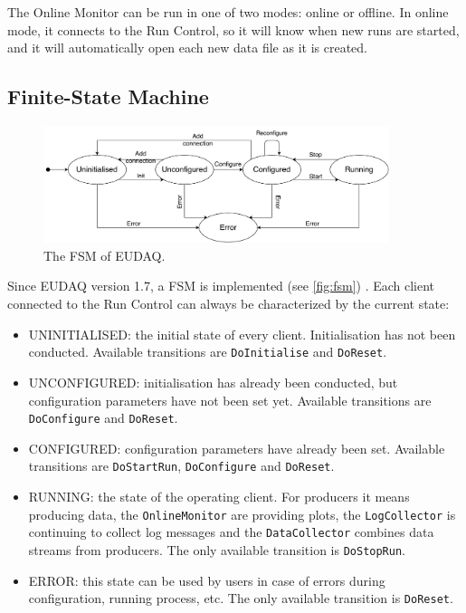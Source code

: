 The Online Monitor can be run in one of two modes: online or offline.
In online mode, it connects to the Run Control, so it will know when new runs are started,
and it will automatically open each new data file as it is created.

\subsection{Finite-State Machine}
\label{sec:fsm}

\begin{figure}
\begin{center}
\includegraphics[width=0.9\textwidth]{src/images/fsmv2.pdf}
\end{center}
\caption{The FSM of EUDAQ.}
\label{fig:fsm}
\end{figure}

Since EUDAQ version 1.7, a \gls{FSM} is implemented (see \autoref{fig:fsm}) \cite{Shirokova:2016}.
Each client connected to the Run Control can always be characterized by the current state:

\begin{itemize}
\item UNINITIALISED: the initial state of every client. Initialisation has not been conducted. Available transitions are \texttt{DoInitialise} and \texttt{DoReset}.%
\item UNCONFIGURED: initialisation has already been conducted, but configuration parameters have not been set yet. Available transitions are \texttt{DoConfigure} and \texttt{DoReset}.
\item CONFIGURED: configuration parameters have already been set. Available transitions are \texttt{DoStartRun}, \texttt{DoConfigure} and \texttt{DoReset}.
\item RUNNING: the state of the operating client. For producers it means producing data, the \texttt{OnlineMonitor} are providing plots, the \texttt{LogCollector} is continuing to collect log messages and the \texttt{DataCollector} combines data streams from producers. The only available transition is \texttt{DoStopRun}.
\item ERROR: this state can be used by users in case of errors during configuration, running process, etc. The only available transition is \texttt{DoReset}.
\end{itemize}


